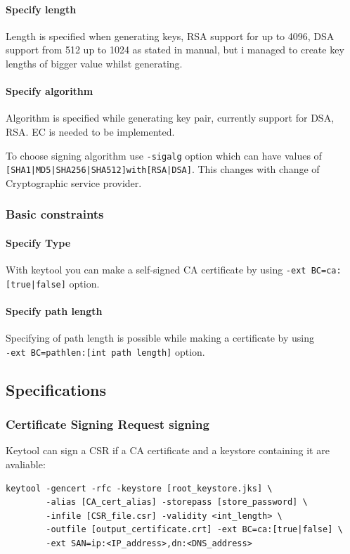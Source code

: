 \documentclass[10pt, a4paper]{report}
\begin{document}
      \paragraph{Specify length}
Length is specified when generating keys, RSA support for up to 4096, DSA support from 512 up to 1024 as stated in manual, but i managed to create key lengths of bigger value whilst generating.

      \paragraph{Specify algorithm}
Algorithm is specified while generating key pair, currently support for DSA, RSA. EC is needed to be implemented.      

To choose signing algorithm use \verb+-sigalg+ option which can have values of \verb+[SHA1|MD5|SHA256|SHA512]with[RSA|DSA]+. This changes with change of Cryptographic service provider.
    \subsubsection{Basic constraints}
    
      \paragraph{Specify Type}
With keytool you can make a self-signed CA certificate by using \verb+-ext BC=ca:[true|false]+ option.

      \paragraph{Specify path length}
Specifying of path length is possible while making a certificate by using  \\
\verb+-ext BC=pathlen:[int path length]+ option.

  \subsection{Specifications}
  
    \subsubsection{Certificate Signing Request signing}
Keytool can sign a CSR if a CA certificate and a keystore containing it are avaliable:
\begin{verbatim}
keytool -gencert -rfc -keystore [root_keystore.jks] \
        -alias [CA_cert_alias] -storepass [store_password] \
        -infile [CSR_file.csr] -validity <int_length> \
        -outfile [output_certificate.crt] -ext BC=ca:[true|false] \
        -ext SAN=ip:<IP_address>,dn:<DNS_address> 
\end{verbatim}
\end{document}
